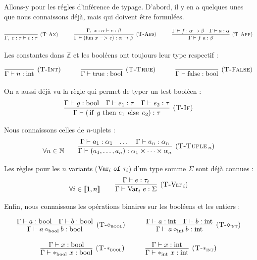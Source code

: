 \documentclass[11pt]{article}
\begin{document}
Allons-y pour les régles d'inférence de typage. D'abord, il y en a quelques unes que nous connaissons déjà, mais qui doivent être formulées.

$$
\infer[(\text{\scshape{T-Ax}})] 
{\Gamma,~e:\tau\vdash e:\tau}{}
~~~~~~~~~
\infer[(\text{\scshape{T-Abs}})]
{\Gamma\vdash(\text{\lstinline|fun|}~x~\text{\lstinline|->|}~e):\alpha\to\beta}
{\Gamma,~x:\alpha\vdash e:\beta}
~~~~~~~~~
\infer[(\text{\scshape{T-App}})]
{\Gamma \vdash f~a:\beta}
{\Gamma\vdash f:\alpha\to\beta & \Gamma\vdash a:\alpha}
$$

Les constantes dans $\mathbb{Z}$ et les booléens ont toujours leur type respectif :

$$
\infer[(\text{\scshape{T-Int}})] 
{\Gamma\vdash n:\text{int}}{}
~~~~~~~~~
\infer[(\text{\scshape{T-True}})] 
{\Gamma\vdash \text{true}:\text{bool}}{}
~~~~~~~~~
\infer[(\text{\scshape{T-False}})] 
{\Gamma\vdash \text{false}:\text{bool}}{}
$$

On a aussi déjà vu la règle qui permet de typer un test booléen :
$$
\infer[(\text{\scshape{T-If}})] 
{\Gamma \vdash (\text{\lstinline|if|}~g~\text{\lstinline|then|}~e_1~\text{\lstinline|else|}~e_2):\tau}
{
    \Gamma \vdash g:\text{bool}
    &
    \Gamma \vdash e_1:\tau
    &
    \Gamma \vdash e_2:\tau
}
$$

Nous connaissons celles de $n$-uplets :
$$
\forall n\in\mathbb{N}~~~~~~
\infer[(\text{\scshape{T-Tuple$\,_n$}})]
{\Gamma\vdash (a_1, \dots, a_n) : \alpha_1\times\dots\times\alpha_n}
{
    \Gamma\vdash a_1:\alpha_1&
    \dots&
    \Gamma\vdash a_n:\alpha_n
}
$$

Les règles pour les $n$ variants ($\text{Var}_i~\verb|of|~\tau_i$) d'un type somme $\Sigma$ sont déjà connues :
$$\forall i\in\left\llbracket1, n\right\rrbracket~~~~~~
\infer[(\text{{\scshape{T-}}\text{Var}$\,_i$})]
{\Gamma \vdash \text{Var}_i~e:\Sigma}
{\Gamma \vdash e:\tau_i}
$$

Enfin, nous connaissons les opérations binaires sur les booléens et les entiers :

$$
\infer[(\text{\scshape{T-$\diamond_\text{bool}$}})] 
{\Gamma \vdash a \diamond_\text{bool} b:\text{bool}}
{
    \Gamma \vdash a:\text{bool}&
    \Gamma \vdash b:\text{bool}
}
~~~~~~~~~
\infer[(\text{\scshape{T-$\diamond_\text{int}$}})] 
{\Gamma \vdash a \diamond_\text{int} b:\text{int}}
{
    \Gamma \vdash a:\text{int}&
    \Gamma \vdash b:\text{int}
}
$$

$$
\infer[(\text{\scshape{T-$\ast_\text{bool}$}})] 
{\Gamma \vdash \ast_\text{bool}~x:\text{bool}}
{\Gamma \vdash x:\text{bool}}
~~~~~~~~~
\infer[(\text{\scshape{T-$\ast_\text{int}$}})] 
{\Gamma \vdash \ast_\text{int}~x:\text{int}}
{\Gamma \vdash x:\text{int}}
$$
\end{document}
